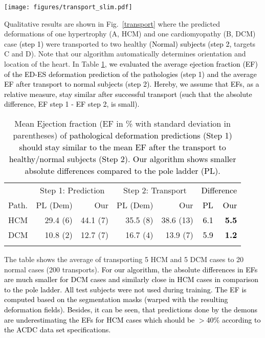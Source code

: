 \documentclass[journal]{IEEEtran}
\newcommand{\update}[1]{\textcolor{black}{#1}}
\begin{document}
\begin{figure*}[tb]
\centering 
\texttt{[image: figures/transport\_slim.pdf]}
\caption{\small{Transport pathological deformation predictions (\update{Step 1,} hypertrophy HCM, myopathy DCM) to healthy (Normal) subjects by using the pole ladder (with LCC-demons) and our probabilistic method \update{(Step 2)}. Note that the pole ladder algorithm requires the registration between pathological and normal subjects while our approach is able to rotate and translate deformations encoded in the latent space $z$ automatically.}}\label{transport}
\end{figure*}
Qualitative results are shown in Fig.~\ref{transport} where the predicted deformations of one hypertrophy (A, HCM) and one cardiomyopathy (B, DCM) case \update{(step 1)} were transported to two healthy \update{(Normal) subjects (step 2,} targets C and D). Note that our algorithm automatically determines orientation and location of the heart. In Table \ref{transportEFTable}, \update{we evaluated the average ejection fraction (EF) of the ED-ES deformation prediction of the pathologies (step 1) and the average EF after transport to normal subjects (step 2). Hereby, we assume that EFs, as a relative measure, stay similar after successful transport (such that the absolute difference, EF step 1 - EF step 2, is small).} 
\begin{table}[h]
\centering
\caption{\small{Mean Ejection fraction (EF in \% with standard deviation in parentheses) of \update{pathological deformation predictions (Step 1) should stay similar to the mean EF after the transport to healthy/normal subjects (Step 2). Our algorithm shows smaller absolute differences compared to the pole ladder (PL).}}}\label{transportEFTable}
\begin{tabular}{l|rr|rr|rr}
 & \multicolumn{2}{c}{Step 1: Prediction} & \multicolumn{2}{c}{Step 2: Transport} & \multicolumn{2}{c}{\update{Difference}} \\
Path. & PL (Dem) & Our & PL (Dem) & Our & \update{PL} & \update{Our} \\
\hline
HCM & 29.4 (6) & 44.1 (7) & 35.5 (8) & 38.6 (13) & \update{6.1} & \update{\bf{5.5}}\\ 
DCM & 10.8 (2) & 12.7 (7) & 16.7 (4) & 13.9 (7) & \update{5.9} & \update{\bf{1.2}}\\ 
\noalign{\smallskip}
\hline
\end{tabular}
\end{table}
The table shows the average of transporting 5 HCM and 5 DCM cases to 20 normal cases (200 transports).
\update{For our algorithm, the absolute differences in EFs are much smaller for DCM cases and similarly close in HCM cases in comparison to the pole ladder. }\update{All test subjects were not used during training. The EF is computed based on the segmentation masks (warped with the resulting deformation fields). Besides, it can be seen, that predictions done by the demons are underestimating the EFs for HCM cases which should be $>$40\% according to the ACDC data set specifications.} 
\end{document}

